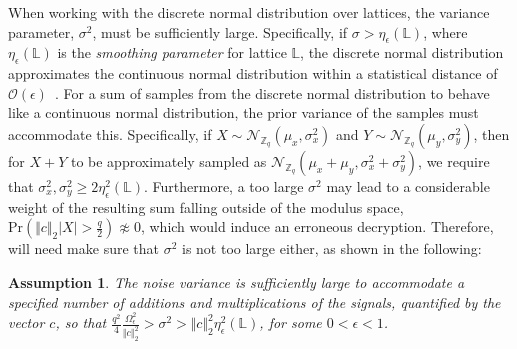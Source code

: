 \documentclass[journal, twoside, web]{ieeecolorpreprint}
\newtheorem{asm}{Assumption}
\begin{document}
When working with the discrete normal distribution over lattices, the variance parameter, $\sigma^2$, must be sufficiently large. Specifically, if $\sigma > \eta_\epsilon(\mathbb L)$, where $\eta_\epsilon(\mathbb L)$ is the \emph{smoothing parameter} for lattice $\mathbb L$, the discrete normal distribution approximates the continuous normal distribution within a statistical distance of $\mathcal O (\epsilon)$~\cite{boneh2011}. 
For a sum of samples from the discrete normal distribution to behave like a continuous normal distribution, the prior variance of the samples must accommodate this. Specifically, if $X \sim \mathcal{N}_{\mathbb{Z}_q} (\mu_x, \sigma^2_x)$ and $Y \sim \mathcal{N}_{\mathbb{Z}_q} (\mu_y, \sigma^2_y)$, then for $X+Y$ to be approximately sampled as $\mathcal{N}_{\mathbb{Z}_q} (\mu_x+\mu_y, \sigma^2_x+\sigma^2_y)$, we require that $\sigma_x^2, \sigma_y^2 \geq 2\eta_\epsilon^2(\mathbb L)$. Furthermore, a too large $\sigma^2$ may lead to a considerable weight of the resulting sum falling outside of the modulus space, $\mathrm{Pr}(\Vert c \Vert_2|X|> \frac{q}{2}) \not \approx 0$, which would induce an erroneous decryption. Therefore, will need make sure that $\sigma^2$ is not too large either, as shown in the following:
\begin{asm}\label{asm:noise_var}
    The noise variance is sufficiently large to accommodate a specified number of additions and multiplications of the signals, quantified by the vector $c $, so that $ \frac{q^2}{4} \frac{\Omega^2_\epsilon}{\Vert c \Vert_2^2} > \sigma^2 > \Vert c \Vert^2_2 \eta_\epsilon^2(\mathbb L)$, for some $0<\epsilon<1$. %
\end{asm}

\end{document}
